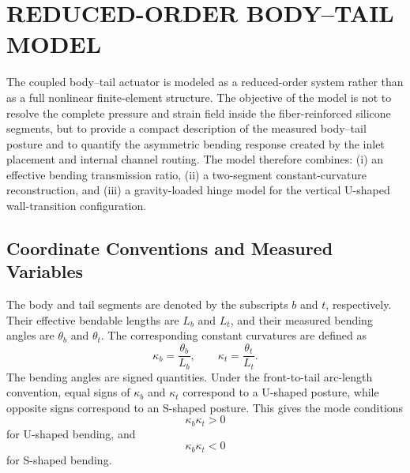 

\section{REDUCED-ORDER BODY--TAIL MODEL}
\label{sec:body_tail_model}

The coupled body--tail actuator is modeled as a reduced-order system rather than as a full nonlinear finite-element structure. The objective of the model is not to resolve the complete pressure and strain field inside the fiber-reinforced silicone segments, but to provide a compact description of the measured body--tail posture and to quantify the asymmetric bending response created by the inlet placement and internal channel routing. The model therefore combines: (i) an effective bending transmission ratio, (ii) a two-segment constant-curvature reconstruction, and (iii) a gravity-loaded hinge model for the vertical U-shaped wall-transition configuration.

\subsection{Coordinate Conventions and Measured Variables}

The body and tail segments are denoted by the subscripts $b$ and $t$, respectively. Their effective bendable lengths are $L_b$ and $L_t$, and their measured bending angles are $\theta_b$ and $\theta_t$. The corresponding constant curvatures are defined as
\begin{equation}
  \kappa_b = \frac{\theta_b}{L_b}, \qquad
  \kappa_t = \frac{\theta_t}{L_t}.
  \label{eqn:body_tail_curvature}
\end{equation}
The bending angles are signed quantities. Under the front-to-tail arc-length convention, equal signs of $\kappa_b$ and $\kappa_t$ correspond to a U-shaped posture, while opposite signs correspond to an S-shaped posture. This gives the mode conditions
\begin{equation}
  \kappa_b \kappa_t > 0
  \label{eqn:u_shape_condition}
\end{equation}
for U-shaped bending, and
\begin{equation}
  \kappa_b \kappa_t < 0
  \label{eqn:s_shape_condition}
\end{equation}
for S-shaped bending.

